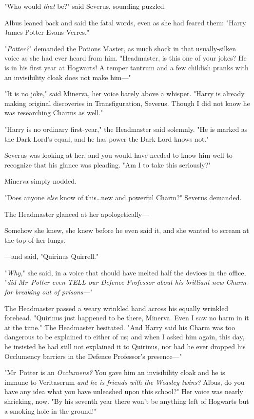 "Who would \emph{that} be?" said Severus, sounding puzzled.

Albus leaned back and said the fatal words, even as she had feared them: "Harry
James Potter-Evans-Verres."

"\emph{Potter?}" demanded the Potions Master, as much shock in that
usually-silken voice as she had ever heard from him. "Headmaster, is this one
of your jokes? He is in his first year at Hogwarts! A temper tantrum and a few
childish pranks with an invisibility cloak does not make him---"

"It is no joke," said Minerva, her voice barely above a whisper. "Harry is
already making original discoveries in Transfiguration, Severus. Though I did
not know he was researching Charms as well."

"Harry is no ordinary first-year," the Headmaster said solemnly. "He is marked
as the Dark Lord's equal, and he has power the Dark Lord knows not."

Severus was looking at her, and you would have needed to know him well to
recognize that his glance was pleading. "Am I to take this seriously?"

Minerva simply nodded.

"Does anyone \emph{else} know of this…new and powerful Charm?" Severus
demanded.

The Headmaster glanced at her apologetically---

Somehow she knew, she knew before he even said it, and she wanted to scream at
the top of her lungs.

---and said, "Quirinus Quirrell."

"\emph{Why,}" she said, in a voice that should have melted half the devices in
the office, "\emph{did Mr~Potter even TELL our Defence Professor about his
brilliant new Charm for breaking out of prisons---}"

The Headmaster passed a weary wrinkled hand across his equally wrinkled
forehead. "Quirinus just happened to be there, Minerva. Even I saw no harm in
it at the time." The Headmaster hesitated. "And Harry said his Charm was too
dangerous to be explained to either of us; and when I asked him again, this
day, he insisted he had still not explained it to Quirinus, nor had he ever
dropped his Occlumency barriers in the Defence Professor's presence---"

"Mr~Potter is an \emph{Occlumens?} You gave him an invisibility cloak and he
is immune to Veritaserum \emph{and he is friends with the Weasley twins?}
Albus, do you have any idea what you have unleashed upon this school?" Her
voice was nearly shrieking, now. "By his seventh year there won't be anything
left of Hogwarts but a smoking hole in the ground!"

